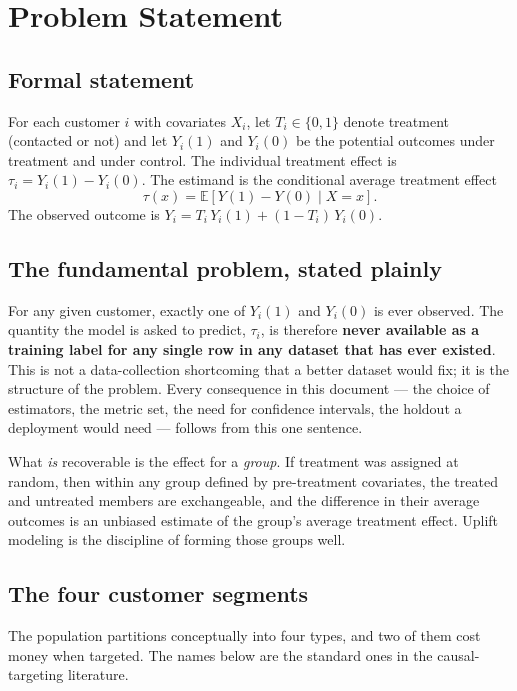 \documentclass[11pt,a4paper]{article}
\begin{document}
\section{Problem Statement}

\subsection{Formal statement}

For each customer $i$ with covariates $X_i$, let $T_i \in \{0,1\}$ denote treatment (contacted or
not) and let $Y_i(1)$ and $Y_i(0)$ be the potential outcomes under treatment and under control.
The individual treatment effect is $\tau_i = Y_i(1) - Y_i(0)$. The estimand is the conditional
average treatment effect
\[
\tau(x) = \mathbb{E}\!\left[Y(1) - Y(0) \mid X = x\right].
\]
The observed outcome is $Y_i = T_i\,Y_i(1) + (1 - T_i)\,Y_i(0)$.

\subsection{The fundamental problem, stated plainly}
\label{sec:fundamental}

\begin{alertbox}
For any given customer, exactly one of $Y_i(1)$ and $Y_i(0)$ is ever observed. The quantity the
model is asked to predict, $\tau_i$, is therefore \textbf{never available as a training label for
any single row in any dataset that has ever existed}. This is not a data-collection shortcoming
that a better dataset would fix; it is the structure of the problem. Every consequence in this
document --- the choice of estimators, the metric set, the need for confidence intervals, the
holdout a deployment would need --- follows from this one sentence.
\end{alertbox}

What \emph{is} recoverable is the effect for a \emph{group}. If treatment was assigned at random,
then within any group defined by pre-treatment covariates, the treated and untreated members are
exchangeable, and the difference in their average outcomes is an unbiased estimate of the group's
average treatment effect. Uplift modeling is the discipline of forming those groups well.

\subsection{The four customer segments}

The population partitions conceptually into four types, and two of them cost money when targeted.
The names below are the standard ones in the causal-targeting literature.
\end{document}
